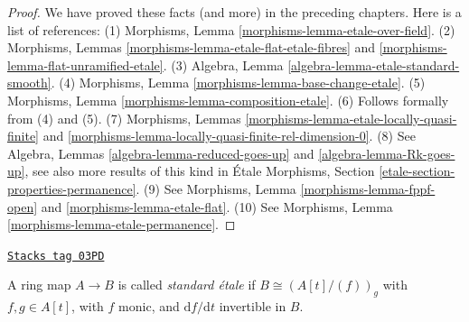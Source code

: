 \begin{proof}
We have proved these facts (and more) in the preceding chapters.
Here is a list of references:
(1) Morphisms, Lemma \ref{morphisms-lemma-etale-over-field}.
(2) Morphisms, Lemmas \ref{morphisms-lemma-etale-flat-etale-fibres}
and \ref{morphisms-lemma-flat-unramified-etale}.
(3) Algebra, Lemma \ref{algebra-lemma-etale-standard-smooth}.
(4) Morphisms, Lemma \ref{morphisms-lemma-base-change-etale}.
(5) Morphisms, Lemma \ref{morphisms-lemma-composition-etale}.
(6) Follows formally from (4) and (5).
(7) Morphisms, Lemmas \ref{morphisms-lemma-etale-locally-quasi-finite}
and \ref{morphisms-lemma-locally-quasi-finite-rel-dimension-0}.
(8) See Algebra, Lemmas \ref{algebra-lemma-reduced-goes-up} and
\ref{algebra-lemma-Rk-goes-up}, see also more results of this kind
in \'Etale Morphisms, Section \ref{etale-section-properties-permanence}.
(9) See Morphisms, Lemma \ref{morphisms-lemma-fppf-open} and
\ref{morphisms-lemma-etale-flat}.
(10) See Morphisms, Lemma \ref{morphisms-lemma-etale-permanence}.
\end{proof}

\begin{definition}
\label{etale-cohomology-definition-standard-etale}
\href{https://stacks.math.columbia.edu/tag/03PD}{\texttt{Stacks tag 03PD}}

A ring map $A \to B$ is called {\it standard \'etale} if
$B \cong \left(A[t]/(f)\right)_g$ with $f, g \in A[t]$, with $f$ monic,
and $\text{d}f/\text{d}t$ invertible in $B$.
\end{definition}


